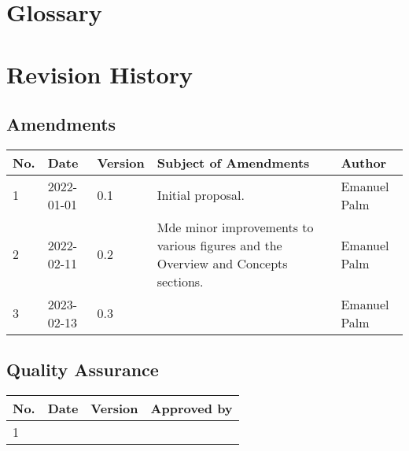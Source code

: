 \documentclass[a4paper]{arrowhead}
\begin{document}
\section{Glossary}
\label{sec:glossary}


\renewcommand{\bibsection}{\section{References}\label{sec:references}}



\newpage

\section{Revision History}
\label{sec:revision}

\subsection{Amendments}

\noindent\begin{tabularx}{\textwidth}{| p{1cm} | p{2cm} | p{1.25cm} | X | p{4cm} |} \hline
\rowcolor{gray!33} No. & Date & Version & Subject of Amendments & Author \\ \hline

1 & 2022-01-01 & 0.1 & Initial proposal. & Emanuel Palm \\ \hline
2 & 2022-02-11 & 0.2 & Mde minor improvements to various figures and the Overview and Concepts sections. & Emanuel Palm \\ \hline
3 & 2023-02-13 & 0.3 & & Emanuel Palm \\ \hline

\end{tabularx}

\subsection{Quality Assurance}

\noindent\begin{tabularx}{\textwidth}{| p{1cm} | p{2cm} | p{1.25cm} | X |} \hline
\rowcolor{gray!33} No. & Date & Version & Approved by \\ \hline

1 & & & \\ \hline

\end{tabularx}
\end{document}
